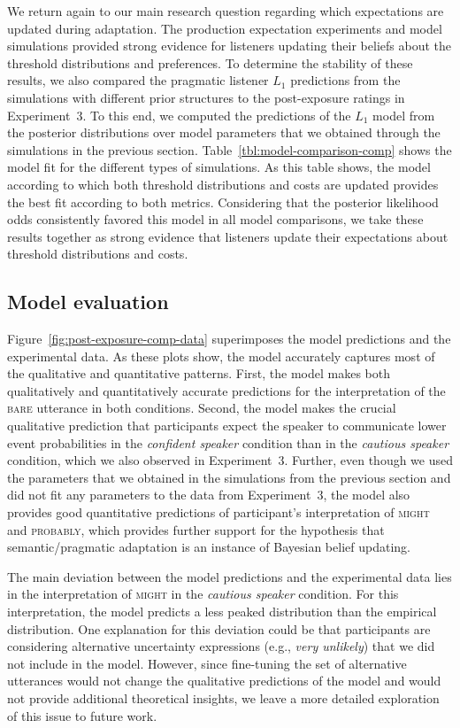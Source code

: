 \documentclass[man, floatsintext]{apa6}
\newcommand{\tableref}[1]{Table~\ref{#1}}
\newcommand{\figref}[1]{Figure~\ref{#1}}
\begin{document}
We return again to our main research question regarding which expectations are updated during adaptation. The production expectation experiments and model simulations provided strong evidence for listeners updating 
their beliefs about the threshold distributions and preferences. 
To determine the stability of these results, we also compared the pragmatic listener $L_1$ predictions from the simulations with different prior structures to the post-exposure ratings in Experiment~3. To this end, we computed the predictions of the $L_1$ model from the
posterior distributions over model parameters that we obtained through the simulations in the previous section. \tableref{tbl:model-comparison-comp} shows the model fit
for the different types of simulations. As this table shows, the model according to which both threshold distributions and costs are updated provides the best fit according to both metrics. 
Considering that the posterior likelihood odds consistently favored this model in all model comparisons, we take these results together as strong evidence that listeners update their expectations about threshold distributions
and costs. 

\subsection{Model evaluation}


\figref{fig:post-exposure-comp-data} superimposes the model predictions and the experimental data. As these plots show, the model accurately captures most of the qualitative and quantitative patterns. First, 
the model makes both qualitatively and quantitatively accurate predictions for the interpretation of the \textsc{bare} utterance in both conditions. Second, the model makes the crucial qualitative prediction that participants expect the speaker to communicate lower event probabilities in the \textit{confident speaker} condition than in the \textit{cautious speaker} condition, which we also observed in Experiment~3. Further, even though we used the parameters that we obtained in the simulations from the previous section and did not fit any parameters to the data from Experiment~3, the model also provides good quantitative predictions of participant's interpretation of \textsc{might} and \textsc{probably},
which provides further support for the hypothesis that semantic/pragmatic adaptation is an instance of Bayesian belief updating.

The main deviation between the model predictions and the experimental data lies in the interpretation of \textsc{might} in the \textit{cautious speaker} condition. For this interpretation, the model predicts a less peaked distribution than the empirical distribution.  One explanation for this deviation could be that participants are considering alternative uncertainty expressions (e.g., \textit{very unlikely}) that we did not include in the model.  However, since fine-tuning the set of alternative utterances would not change the qualitative predictions of the model and would not provide additional theoretical insights, we leave a more detailed exploration of this issue to future work. 
\end{document}
